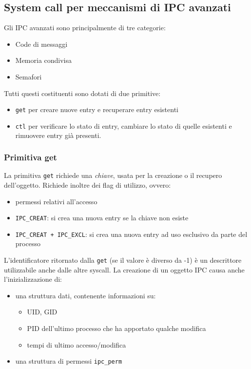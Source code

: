 \documentclass[a4paper, 10pt]{article}
\begin{document}
\subsection{System call per meccanismi di IPC avanzati}
Gli IPC avanzati sono principalmente di tre categorie:
\begin{itemize}
\item Code di messaggi
\item Memoria condivisa
\item Semafori
\end{itemize}
Tutti questi costituenti sono dotati di due primitive:
\begin{itemize}
\item \verb|get| per creare nuove entry e recuperare entry esistenti
\item \verb|ctl| per verificare lo stato di entry, cambiare lo stato di quelle esistenti e rimuovere entry già presenti.
\end{itemize}

\subsubsection{Primitiva get}
La primitiva \verb|get| richiede una \textit{chiave}, usata per la creazione o il recupero dell'oggetto. Richiede inoltre dei flag di utilizzo, ovvero:
\begin{itemize}
\item permessi relativi all'accesso
\item \verb|IPC_CREAT|: si crea una nuova entry se la chiave non esiste
\item \verb|IPC_CREAT + IPC_EXCL|: si crea una nuova entry ad uso esclusivo da parte del processo
\end{itemize}
L'identificatore ritornato dalla \verb|get| (se il valore è diverso da -1) è un descrittore utilizzabile anche dalle altre syscall.
La creazione di un oggetto IPC causa anche l'inizializzazione di:
\begin{itemize}
\item una struttura dati, contenente informazioni su:
\begin{itemize}
\item UID, GID
\item PID dell'ultimo processo che ha apportato qualche modifica
\item tempi di ultimo accesso/modifica
\end{itemize}
\item una struttura di permessi \verb|ipc_perm|
\end{itemize}
\end{document}
